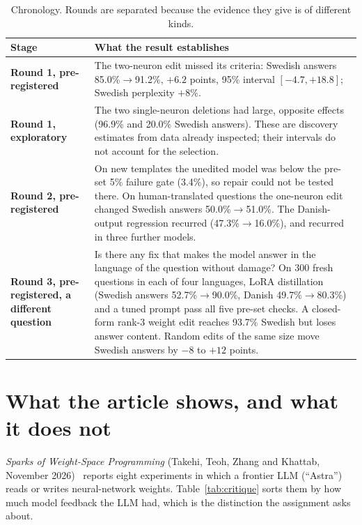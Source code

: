 \documentclass[10pt,a4paper]{article}
\newcommand{\up}{$\rightarrow$}
\begin{document}
\begin{table}[H]\small\centering
\begin{tabularx}{\textwidth}{@{}>{\raggedright\arraybackslash}p{3.1cm}X@{}}
\toprule
Stage & What the result establishes\\
\midrule
\textbf{Round 1, pre-registered} & The two-neuron edit missed its criteria: Swedish answers 85.0\%\up91.2\%, $+6.2$ points, 95\% interval $[-4.7,+18.8]$; Swedish perplexity $+8\%$.\\
\textbf{Round 1, exploratory} & The two single-neuron deletions had large, opposite effects (96.9\% and 20.0\% Swedish answers). These are discovery estimates from data already inspected; their intervals do not account for the selection.\\
\textbf{Round 2, pre-registered} & On new templates the unedited model was below the pre-set 5\% failure gate (3.4\%), so repair could not be tested there. On human-translated questions the one-neuron edit changed Swedish answers 50.0\%\up51.0\%. The Danish-output regression recurred (47.3\%\up16.0\%), and recurred in three further models.\\
\textbf{Round 3, pre-registered, a different question} & Is there any fix that makes the model answer in the language of the question without damage? On 300 fresh questions in each of four languages, LoRA distillation (Swedish answers 52.7\%\up90.0\%, Danish 49.7\%\up80.3\%) and a tuned prompt pass all five pre-set checks. A closed-form rank-3 weight edit reaches 93.7\% Swedish but loses answer content. Random edits of the same size move Swedish answers by $-8$ to $+12$ points.\\
\bottomrule
\end{tabularx}
\caption{Chronology. Rounds are separated because the evidence they give is of different kinds.}\label{tab:chrono}
\end{table}

\section{What the article shows, and what it does not}

\emph{Sparks of Weight-Space Programming} (Takehi, Teoh, Zhang and Khattab, November 2026)~\cite{takehi2026} reports eight experiments in which a frontier LLM (``Astra'') reads or writes
neural-network weights. Table~\ref{tab:critique} sorts them by how much model feedback the LLM had, which is the distinction the assignment asks about.
\end{document}
